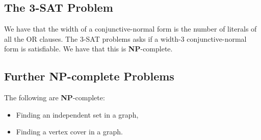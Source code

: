 \subsection{The 3-SAT Problem}

We have that the width of a conjunctive-normal form is the number of literals
of all the OR clauses. The 3-SAT problems asks if a width-3 conjunctive-normal 
form is satisfiable. We have that this is \textbf{NP}-complete.

\subsection{Further \textbf{NP}-complete Problems}

The following are \textbf{NP}-complete: \begin{itemize}
  \item Finding an independent set in a graph,
  \item Finding a vertex cover in a graph.
\end{itemize}